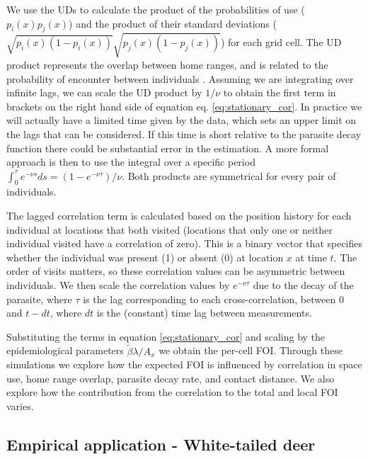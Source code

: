 \documentclass[letterpaper]{article}
\begin{document}
We use the UDs to calculate the product of the probabilities of use ($p_i(x)p_j(x)$) and the product of their standard deviations ($\sqrt{p_i(x)(1-p_i(x))}\sqrt{p_j(x)(1-p_j(x))}$) for each grid cell.
The UD product represents the overlap between home ranges, and is related to the probability of encounter between individuals \citep{Noonan2021}. Assuming we are integrating over infinite lags, we can scale the UD product by $1/\nu$ to obtain the first term in brackets on the right hand side of equation eq. \ref{eq:stationary_cor}. In practice we will actually have a limited time given by the data, which sets an upper limit on the lags that can be considered. If this time is short relative to the parasite decay function there could be substantial error in the estimation. A more formal approach is then to use the integral over a specific period  $\int_0^{\tau} e^{-\nu s}ds=(1-e^{-\nu\tau})/\nu$.
 Both products are symmetrical for every pair of individuals. 

The lagged correlation term is calculated based on the position history for each individual at locations that both visited (locations that only one or neither individual visited have a correlation of zero). This is a binary vector that specifies whether the individual was present (1) or absent (0) at location $x$ at time $t$. 
The order of visits matters, so these correlation values can be asymmetric between individuals. 
We then scale the correlation values by $e^{-\nu\tau}$ due to the decay of the parasite, where $\tau$ is the lag corresponding to each cross-correlation, between 0 and $t-dt$, where $dt$ is the (constant) time lag between measurements. 

Substituting the terms in equation \ref{eq:stationary_cor} and scaling by the epidemiological parameters $\tilde\beta\lambda/ A_x$ we obtain the per-cell FOI. Through these simulations we explore how the expected FOI is influenced by correlation in space use, home range overlap, parasite decay rate, and contact distance. We also explore how the contribution from the correlation to the total and local FOI varies. 


\subsection*{Empirical application - White-tailed deer}
\end{document}
